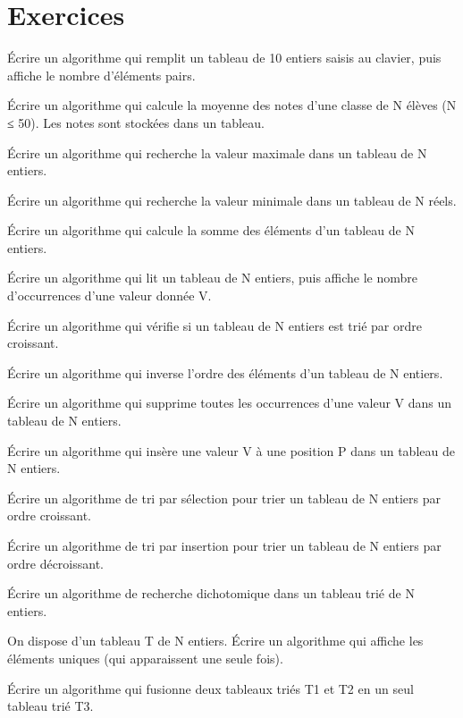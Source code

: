 \section{Exercices}


\exo{}
Écrire un algorithme qui remplit un tableau de 10 entiers saisis au clavier, puis affiche le nombre d'éléments pairs.

\exo{}
Écrire un algorithme qui calcule la moyenne des notes d'une classe de N élèves (N ≤ 50). Les notes sont stockées dans un tableau.

\exo{}
Écrire un algorithme qui recherche la valeur maximale dans un tableau de N entiers.

\exo{}
Écrire un algorithme qui recherche la valeur minimale dans un tableau de N réels.

\exo{}
Écrire un algorithme qui calcule la somme des éléments d'un tableau de N entiers.

\exo{}
Écrire un algorithme qui lit un tableau de N entiers, puis affiche le nombre d'occurrences d'une valeur donnée V.

\exo{}
Écrire un algorithme qui vérifie si un tableau de N entiers est trié par ordre croissant.

\exo{}
Écrire un algorithme qui inverse l'ordre des éléments d'un tableau de N entiers.

\exo{}
Écrire un algorithme qui supprime toutes les occurrences d'une valeur V dans un tableau de N entiers.

\exo{}
Écrire un algorithme qui insère une valeur V à une position P dans un tableau de N entiers.


\exo{}
Écrire un algorithme de tri par sélection pour trier un tableau de N entiers par ordre croissant.

\exo{}
Écrire un algorithme de tri par insertion pour trier un tableau de N entiers par ordre décroissant.

\exo{}
Écrire un algorithme de recherche dichotomique dans un tableau trié de N entiers.

\exo{}
On dispose d'un tableau T de N entiers. Écrire un algorithme qui affiche les éléments uniques (qui apparaissent une seule fois).

\exo{}
Écrire un algorithme qui fusionne deux tableaux triés T1 et T2 en un seul tableau trié T3.

